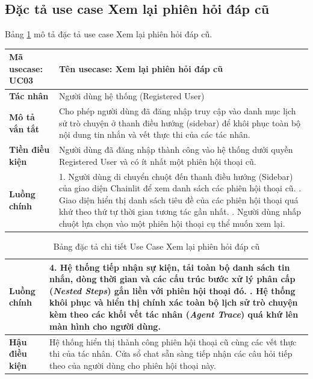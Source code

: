 \documentclass[../DoAn.tex]{subfiles}
\begin{document}
\subsection{Đặc tả use case Xem lại phiên hỏi đáp cũ}
Bảng \ref{table:uc_specs_resume} mô tả đặc tả use case Xem lại phiên hỏi đáp cũ.
\begin{table}[H]
\centering
\begin{tabular}{|p{3.5cm}|p{11.5cm}|}
\hline
\textbf{Mã usecase:} UC03 & \textbf{Tên usecase:} Xem lại phiên hỏi đáp cũ \\ \hline
\textbf{Tác nhân} & Người dùng hệ thống (Registered User) \\ \hline
\textbf{Mô tả vắn tắt} & Cho phép người dùng đã đăng nhập truy cập vào danh mục lịch sử trò chuyện ở thanh điều hướng (sidebar) để khôi phục toàn bộ nội dung tin nhắn và vết thực thi của các tác nhân. \\ \hline
\textbf{Tiền điều kiện} & Người dùng đã đăng nhập thành công vào hệ thống dưới quyền Registered User và có ít nhất một phiên hội thoại cũ. \\ \hline
\textbf{Luồng chính} & 
1. Người dùng di chuyển chuột đến thanh điều hướng (Sidebar) của giao diện Chainlit để xem danh sách các phiên hội thoại cũ. \newline
2. Giao diện hiển thị danh sách tiêu đề của các phiên hội thoại quá khứ theo thứ tự thời gian tương tác gần nhất. \newline
3. Người dùng nhấp chuột lựa chọn vào một phiên hội thoại cụ thể muốn xem lại. \\ \hline
\end{tabular}
\end{table}
\begin{table}[H]
\centering
\begin{tabular}{|p{3.5cm}|p{11.5cm}|}
\hline
\textbf{Luồng chính} & 
4. Hệ thống tiếp nhận sự kiện, tải toàn bộ danh sách tin nhắn, dòng thời gian và các cấu trúc bước xử lý phân cấp (\textit{Nested Steps}) gắn liền với phiên hội thoại đó. \newline
5. Hệ thống khôi phục và hiển thị chính xác toàn bộ lịch sử trò chuyện kèm theo các khối vết tác nhân (\textit{Agent Trace}) quá khứ lên màn hình cho người dùng. \\ \hline
\textbf{Hậu điều kiện} & Hệ thống hiển thị thành công phiên hội thoại cũ cùng các vết thực thi của tác nhân. Cửa sổ chat sẵn sàng tiếp nhận các câu hỏi tiếp theo của người dùng cho phiên hội thoại này. \\ \hline
\end{tabular}
\caption{Bảng đặc tả chi tiết Use Case Xem lại phiên hỏi đáp cũ}
\label{table:uc_specs_resume}
\end{table}
\end{document}
